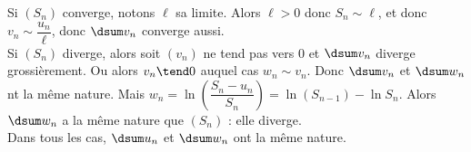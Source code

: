 Si $(S_n)$ converge, notons $\ell$ sa limite. Alors $\ell>0$ donc $S_n\sim\ell$, et donc $v_n\sim\dfrac{u_n}{\ell}$, donc $\dsum v_n$ converge aussi.\\
Si $(S_n)$ diverge, alors soit $(v_n)$ ne tend pas vers 0 et $\dsum v_n$ diverge grossièrement. Ou alors $v_n\tend 0$ auquel cas $w_n\sim v_n$. Donc $\dsum v_n$ et $\dsum w_n$ nt la même nature. Mais $w_n=\ln\left(\dfrac{S_n-u_n}{S_n}\right)=\ln(S_{n-1})-\ln S_n$. Alors $\dsum w_n$ a la même nature que $(S_n)$ : elle diverge.\\
Dans tous les cas, $\dsum u_n$ et $\dsum w_n$ ont la même nature.

